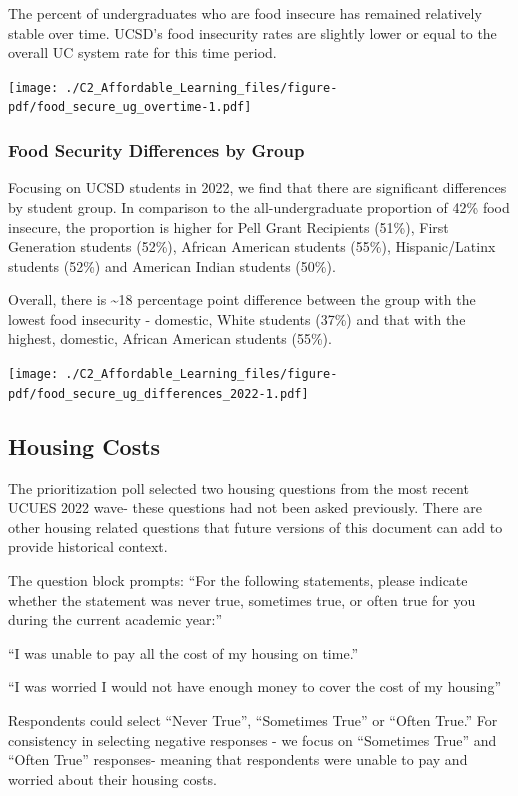 \documentclass[
  letterpaper,
  DIV=11,
  numbers=noendperiod]{scrreprt}
\begin{document}
The percent of undergraduates who are food insecure has remained
relatively stable over time. UCSD's food insecurity rates are slightly
lower or equal to the overall UC system rate for this time period.

\texttt{[image: ./C2\_Affordable\_Learning\_files/figure-pdf/food\_secure\_ug\_overtime-1.pdf]}

\hypertarget{food-security-differences-by-group}{%
\subsubsection{Food Security Differences by
Group}\label{food-security-differences-by-group}}

Focusing on UCSD students in 2022, we find that there are significant
differences by student group. In comparison to the all-undergraduate
proportion of 42\% food insecure, the proportion is higher for Pell
Grant Recipients (51\%), First Generation students (52\%), African
American students (55\%), Hispanic/Latinx students (52\%) and American
Indian students (50\%).

Overall, there is \textasciitilde18 percentage point difference between
the group with the lowest food insecurity - domestic, White students
(37\%) and that with the highest, domestic, African American students
(55\%).

\texttt{[image: ./C2\_Affordable\_Learning\_files/figure-pdf/food\_secure\_ug\_differences\_2022-1.pdf]}

\hypertarget{housing-costs}{%
\subsection{Housing Costs}\label{housing-costs}}

The prioritization poll selected two housing questions from the most
recent UCUES 2022 wave- these questions had not been asked previously.
There are other housing related questions that future versions of this
document can add to provide historical context.

The question block prompts: ``For the following statements, please
indicate whether the statement was never true, sometimes true, or often
true for you during the current academic year:''

``I was unable to pay all the cost of my housing on time.''

``I was worried I would not have enough money to cover the cost of my
housing''

Respondents could select ``Never True'', ``Sometimes True'' or ``Often
True.'' For consistency in selecting negative responses - we focus on
``Sometimes True'' and ``Often True'' responses- meaning that
respondents were unable to pay and worried about their housing costs.
\end{document}
